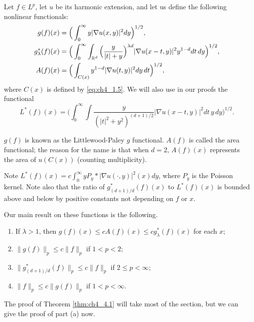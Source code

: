 Let $f \in L^p$, let $u$ be its harmonic extension, and let us define the following nonlinear functionals:
\begin{align}
    g(f)(x) &= \Big(\int_0^\infty y|\nabla u(x,y)|^2dy\Big)^{1/2}, \label{eq:ch4_4.1} \\
    g_\lambda^*(f)(x) &= \Big(\int_0^\infty \int_{\mathbb{R}^d} \Big(\frac{y}{|t| + y}\Big)^{\lambda d}|\nabla u(x-t,y)|^2y^{1-d}dt\,dy\Big)^{1/2}, \label{eq:ch4_4.2} \\
    A(f)(x) &= \Big(\int_{C(x)} y^{1-d}|\nabla u(t,y)|^2dy\,dt\Big)^{1/2}, \label{eq:ch4_4.3}
\end{align}
where $C(x)$ is defined by \eqref{eq:ch4_1.5}. We will also use in our proofs the functional
\begin{equation}\label{eq:ch4_4.4}
    L^*(f)(x) = \Big(\int_0^\infty \int \frac{y}{(|t|^2 + y^2)^{(d+1)/2}}|\nabla u(x-t,y)|^2dt\,y\,dy\Big)^{1/2}.
\end{equation}

$g(f)$ is known as the Littlewood-Paley $g$ functional. $A(f)$ is called the area functional; the reason for the name is that when $d=2$, $A(f)(x)$ represents the area of $u(C(x))$ (counting multiplicity).

Note $L^*(f)(x) = c\int_0^\infty yP_y * |\nabla u(\cdot,y)|^2(x)dy$, where $P_y$ is the Poisson kernel. Note also that the ratio of $g_{(d+1)/d}^*(f)(x)$ to $L^*(f)(x)$ is bounded above and below by positive constants not depending on $f$ or $x$.

Our main result on these functions is the following.

\begin{theorem}\label{thm:ch4_4.1}
\begin{enumerate}[wide, labelindent=0em, labelwidth=\parindent, labelsep = 0em]
    \item If $\lambda > 1$, then $g(f)(x) \leq cA(f)(x) \leq cg_\lambda^*(f)(x)$ for each $x$;
    \item $\|g(f)\|_p \leq c\|f\|_p$ if $1 < p < 2$;
    \item $\|g_{(d+1)/d}^*(f)\|_p \leq c\|f\|_p$ if $2 \leq p < \infty$;
    \item $\|f\|_p \leq c\|g(f)\|_p$ if $1 < p < \infty$.
\end{enumerate}
\end{theorem}


The proof of Theorem \ref{thm:ch4_4.1} will take most of the section, but we can give the proof of part (a) now.

